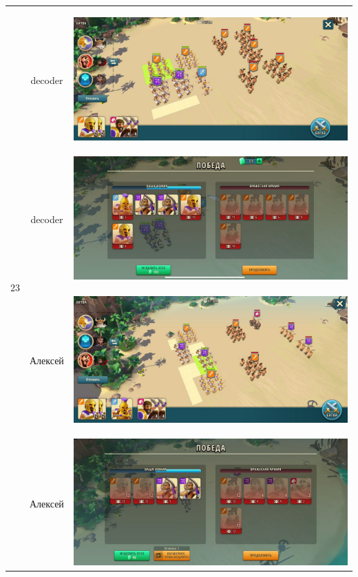 \begin{longtable}{|c|c|c|}
	\hline
	\multirow{6}{*}{23} & decoder &
	\hypertarget{fight23}{\includegraphics[width=0.75\linewidth]{./parts/media/TreasureHunt/23/decoder/photo_2022-04-13_16-27-58.jpg}} \\
	& decoder &
	\includegraphics[width=0.75\linewidth]{./parts/media/TreasureHunt/23/decoder/photo_2022-04-13_16-28-07.jpg} \\
	\hline
	\multirow{4}{*}{24} & Алексей &
	\hypertarget{fight24}{\includegraphics[width=0.75\linewidth]{./parts/media/TreasureHunt/24/alexey/photo_2022-04-13_19-02-08.jpg}} \\
	& Алексей &
	\includegraphics[width=0.75\linewidth]{./parts/media/TreasureHunt/24/alexey/photo_2022-04-13_19-01-59.jpg} \\

\end{longtable}
